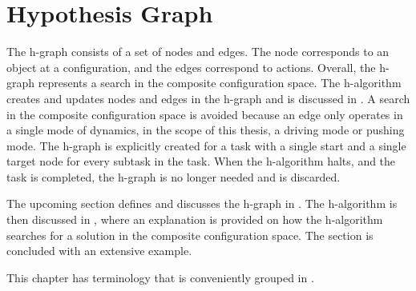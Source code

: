 \section{Hypothesis Graph}%
\label{sec:h-graph}
The \acf{h-graph} consists of a set of nodes and edges. The node corresponds to an object at a configuration, and the edges correspond to actions. Overall, the \ac{h-graph} represents a search in the composite configuration space. The \ac{h-algorithm} creates and updates nodes and edges in the \ac{h-graph} and is discussed in . A search in the composite configuration space is avoided because an edge only operates in a single mode of dynamics, in the scope of this thesis, a driving mode or pushing mode. The \ac{h-graph} is explicitly created for a task with a single start and a single target node for every subtask in the task. When the \ac{h-algorithm} halts, and the task is completed, the \ac{h-graph} is no longer needed and is discarded.\bs

The upcoming section defines and discusses the \ac{h-graph} in . The \ac{h-algorithm} is then discussed in , where an explanation is provided on how the \ac{h-algorithm} searches for a solution in the composite configuration space. The section is concluded with an extensive example.\bs



This chapter has terminology that is conveniently grouped in .\bs

